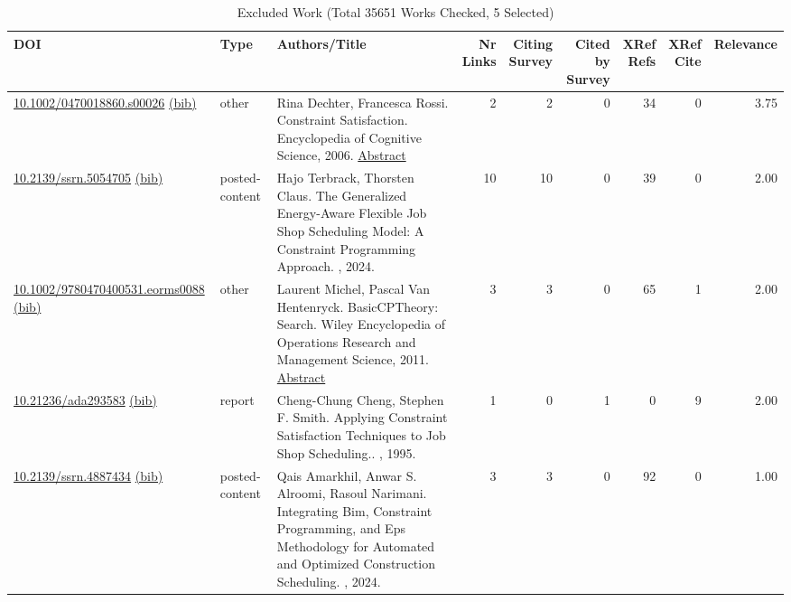 {\scriptsize
\begin{longtable}{p{5cm}lp{11cm}rrrrrr}
\caption{Excluded Work (Total 35651 Works Checked, 5 Selected)}\\ \toprule
DOI & Type & Authors/Title & \shortstack{Nr\\Links} & \shortstack{Citing\\Survey} & \shortstack{Cited by\\Survey} & \shortstack{XRef\\Refs} & \shortstack{XRef\\Cite} & Relevance\\ \midrule\endhead
\bottomrule
\endfoot
\href{http://dx.doi.org/10.1002/0470018860.s00026}{10.1002/0470018860.s00026} \href{https://www.doi2bib.org/bib/10.1002/0470018860.s00026}{(bib)} & other & Rina Dechter, Francesca Rossi. Constraint Satisfaction. Encyclopedia of Cognitive Science, 2006. \hyperref[mw:mw21160]{Abstract} & 2 & 2 & 0 & 34 & 0 &  3.75\\
\href{http://dx.doi.org/10.2139/ssrn.5054705}{10.2139/ssrn.5054705} \href{https://www.doi2bib.org/bib/10.2139/ssrn.5054705}{(bib)} & posted-content & Hajo Terbrack, Thorsten Claus. The Generalized Energy-Aware Flexible Job Shop Scheduling Model: A Constraint Programming Approach. , 2024. & 10 & 10 & 0 & 39 & 0 &  2.00\\
\href{http://dx.doi.org/10.1002/9780470400531.eorms0088}{10.1002/9780470400531.eorms0088} \href{https://www.doi2bib.org/bib/10.1002/9780470400531.eorms0088}{(bib)} & other & Laurent Michel, Pascal Van Hentenryck. BasicCPTheory: Search. Wiley Encyclopedia of Operations Research and Management Science, 2011. \hyperref[mw:mw23605]{Abstract} & 3 & 3 & 0 & 65 & 1 &  2.00\\
\href{http://dx.doi.org/10.21236/ada293583}{10.21236/ada293583} \href{https://www.doi2bib.org/bib/10.21236/ada293583}{(bib)} & report & Cheng-Chung Cheng, Stephen F. Smith. Applying Constraint Satisfaction Techniques to Job Shop Scheduling.. , 1995. & 1 & 0 & 1 & 0 & 9 &  2.00\\
\href{http://dx.doi.org/10.2139/ssrn.4887434}{10.2139/ssrn.4887434} \href{https://www.doi2bib.org/bib/10.2139/ssrn.4887434}{(bib)} & posted-content & Qais Amarkhil, Anwar  S. Alroomi, Rasoul Narimani. Integrating Bim, Constraint Programming, and Eps Methodology for Automated and Optimized Construction Scheduling. , 2024. & 3 & 3 & 0 & 92 & 0 &  1.00\\
\end{longtable}
}

